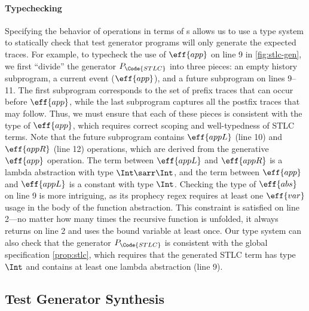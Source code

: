 \paragraph{Typechecking} Specifying the behavior of operations in terms of
\PAT{}s allows us to use a type system to statically check that
test generator programs will only generate the expected traces.
For example, to typecheck the use of $\eff{app}$ on line 9 in
\autoref{fig:stlc-gen}, we first ``divide'' the generator $P_\Code{STLC}$ into three pieces:
an empty history subprogram, a current event ($\eff{app}$), and a future subprogram on lines 9--11. The first subprogram corresponds to the set of prefix traces that can occur before
$\eff{app}$, while the last subprogram captures all the postfix traces that may follow.
Thus, we must ensure that each of these pieces
is consistent with the type of $\eff{app}$, which requires correct scoping and well-typedness of STLC terms.
Note that the future subprogram contains $\eff{appL}$ (line 10) and $\eff{appR}$ (line 12) operations, which are derived from the generative $\eff{app}$ operation. The term between $\eff{appL}$ and $\eff{appR}$ is a lambda abstraction with type $\Int\sarr\Int$, and the term between $\eff{app}$ and $\eff{appL}$ is a constant with type $\Int$. Checking the type of $\eff{abs}$ on line 9 is more intriguing, as its prophecy regex requires at least one $\eff{var}$ usage in the body of the function abstraction. This constraint is satisfied on line 2—no matter how many times the recursive function is unfolded, it always returns on line 2 and uses the bound variable at least once. Our type system can also check that the generator $P_\Code{STLC}$ is consistent with the global specification \ref{prop:stlc}, which requires that the generated STLC term has type $\Int$ and contains at least one lambda abstraction (line 9).



\subsection{Test Generator Synthesis}

